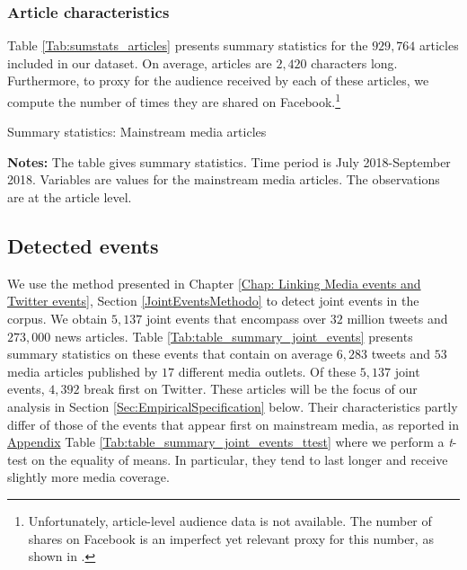 \subsubsection{Article characteristics}

Table \ref{Tab:sumstats_articles} presents summary statistics for the $929,764$ articles included in our dataset. On average, articles are $2,420$ characters long. Furthermore, to proxy for the audience received by each of these articles, we compute the number of times they are shared on Facebook.\footnote{Unfortunately, article-level audience data is not available. The number of shares on Facebook is an imperfect yet relevant proxy for this number, as shown in \citet{CageHerveViaud2020}.}


\begin{table}
\caption{Summary statistics: Mainstream media articles}
\begin{center}
	
\end{center}
\begin{spacing}{0.5}
	{\fns \textbf{Notes:} The table gives summary statistics. Time period is July 2018-September 2018. Variables are values for the mainstream media articles. The observations are at the article level.} 
\end{spacing}
\label{Tab:sumstats_articles}
\end{table} 



\subsection{Detected events}

We use the method presented in Chapter \ref{Chap: Linking Media events and Twitter events}, Section \ref{JointEventsMethodo} to detect joint events in the corpus. We obtain $5,137$ joint events that encompass over $32$ million tweets and $273,000$ news articles. Table \ref{Tab:table_summary_joint_events} presents summary statistics on these events that contain on average $6,283$ tweets and $53$ media articles published by $17$ different media outlets. Of these $5,137$ joint events, $4,392$ break first on Twitter. These articles will be the focus of our analysis in Section \ref{Sec:EmpiricalSpecification} below. Their characteristics partly differ of those of the events that appear first on mainstream media, as reported in \hyperlink{ref:Appendix}{Appendix} Table \ref{Tab:table_summary_joint_events_ttest} where we perform a \textit{t}-test on the equality of means. In particular, they tend to last longer and receive slightly more media coverage.


